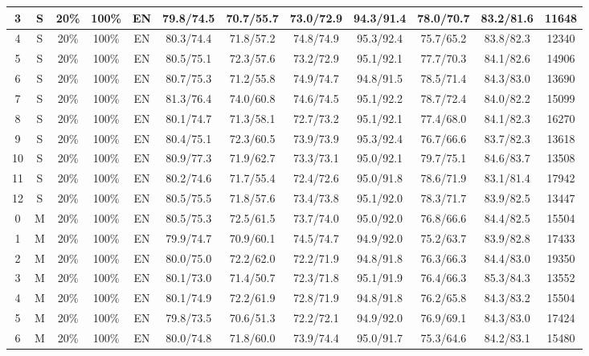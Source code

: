 \begin{table*}
{\begin{tabular}{|c|c|c|c|c||c|c|c|c|c|c||c|}
3 & S & 20\% & 100\% & EN & 79.8/74.5 & 70.7/55.7 & 73.0/72.9 & 94.3/91.4 & 78.0/70.7 & 83.2/81.6 & 11648 \\ \hline
4 & S & 20\% & 100\% & EN & 80.3/74.4 & 71.8/57.2 & 74.8/74.9 & 95.3/92.4 & 75.7/65.2 & 83.8/82.3 & 12340 \\ \hline
5 & S & 20\% & 100\% & EN & 80.5/75.1 & 72.3/57.6 & 73.2/72.9 & 95.1/92.1 & 77.7/70.3 & 84.1/82.6 & 14906 \\ \hline
6 & S & 20\% & 100\% & EN & 80.7/75.3 & 71.2/55.8 & 74.9/74.7 & 94.8/91.5 & 78.5/71.4 & 84.3/83.0 & 13690 \\ \hline
7 & S & 20\% & 100\% & EN & 81.3/76.4 & 74.0/60.8 & 74.6/74.5 & 95.1/92.2 & 78.7/72.4 & 84.0/82.2 & 15099 \\ \hline
8 & S & 20\% & 100\% & EN & 80.1/74.7 & 71.3/58.1 & 72.7/73.2 & 95.1/92.1 & 77.4/68.0 & 84.1/82.3 & 16270 \\ \hline
9 & S & 20\% & 100\% & EN & 80.4/75.1 & 72.3/60.5 & 73.9/73.9 & 95.3/92.4 & 76.7/66.6 & 83.7/82.3 & 13618 \\ \hline
10 & S & 20\% & 100\% & EN & 80.9/77.3 & 71.9/62.7 & 73.3/73.1 & 95.0/92.1 & 79.7/75.1 & 84.6/83.7 & 13508 \\ \hline
11 & S & 20\% & 100\% & EN & 80.2/74.6 & 71.7/55.4 & 72.4/72.6 & 95.0/91.8 & 78.6/71.9 & 83.1/81.4 & 17942 \\ \hline
12 & S & 20\% & 100\% & EN & 80.5/75.5 & 71.8/57.6 & 73.4/73.8 & 95.1/92.0 & 78.3/71.7 & 83.9/82.5 & 13447 \\ \hline
0 & M & 20\% & 100\% & EN & 80.5/75.3 & 72.5/61.5 & 73.7/74.0 & 95.0/92.0 & 76.8/66.6 & 84.4/82.5 & 15504 \\ \hline
1 & M & 20\% & 100\% & EN & 79.9/74.7 & 70.9/60.1 & 74.5/74.7 & 94.9/92.0 & 75.2/63.7 & 83.9/82.8 & 17433 \\ \hline
2 & M & 20\% & 100\% & EN & 80.0/75.0 & 72.2/62.0 & 72.2/71.9 & 94.8/91.8 & 76.3/66.3 & 84.4/83.0 & 19350 \\ \hline
3 & M & 20\% & 100\% & EN & 80.1/73.0 & 71.4/50.7 & 72.3/71.8 & 95.1/91.9 & 76.4/66.3 & 85.3/84.3 & 13552 \\ \hline
4 & M & 20\% & 100\% & EN & 80.1/74.9 & 72.2/61.9 & 72.8/71.9 & 94.8/91.8 & 76.2/65.8 & 84.3/83.2 & 15504 \\ \hline
5 & M & 20\% & 100\% & EN & 79.8/73.5 & 70.6/51.3 & 72.2/72.1 & 94.9/92.0 & 76.9/69.1 & 84.3/83.0 & 17424 \\ \hline
6 & M & 20\% & 100\% & EN & 80.0/74.8 & 71.8/60.0 & 73.9/74.4 & 95.0/91.7 & 75.3/64.6 & 84.2/83.1 & 15480 \\ \hline

\end{tabular}}
\end{table*}
